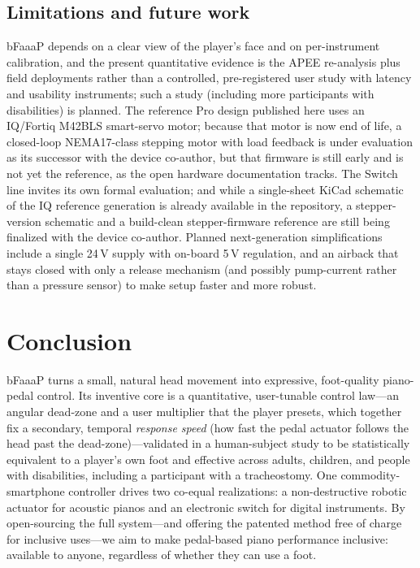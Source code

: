 \subsection{Limitations and future work}
bFaaaP depends on a clear view of the player's face and on per-instrument
calibration, and the present quantitative evidence is the APEE re-analysis plus
field deployments rather than a controlled, pre-registered user study with latency
and usability instruments; such a study (including more participants with
disabilities) is planned. The reference Pro design published here uses an IQ/Fortiq M42BLS
smart-servo motor; because that motor is now end of life, a closed-loop NEMA17-class
stepping motor with load feedback is under evaluation as its successor with the
device co-author, but that firmware is still early and is not yet the reference, as
the open hardware documentation tracks. The Switch line invites its own formal evaluation;
and while a single-sheet KiCad schematic of the IQ reference generation is already
available in the repository, a stepper-version schematic and a build-clean
stepper-firmware reference are still being finalized with the device co-author.
Planned next-generation simplifications include a single 24\,V supply with
on-board 5\,V regulation, and an airback that stays closed with only a release
mechanism (and possibly pump-current rather than a pressure sensor) to make setup
faster and more robust.



\section{Conclusion}
\label{sec:conclusion}
bFaaaP turns a small, natural head movement into expressive, foot-quality
piano-pedal control. Its inventive core is a quantitative, user-tunable control
law---an angular dead-zone and a user multiplier that the player presets, which
together fix a secondary, temporal \emph{response speed} (how fast the pedal
actuator follows the head past the dead-zone)---validated in a human-subject study
to be statistically equivalent to a
player's own foot and effective across adults, children, and people with
disabilities, including a participant with a tracheostomy. One commodity-smartphone
controller drives two co-equal realizations: a non-destructive robotic actuator
for acoustic pianos and an electronic switch for digital instruments. By
open-sourcing the full system---and offering the patented method free of charge for
inclusive uses---we aim to make pedal-based piano performance inclusive: available
to anyone, regardless of whether they can use a foot.
